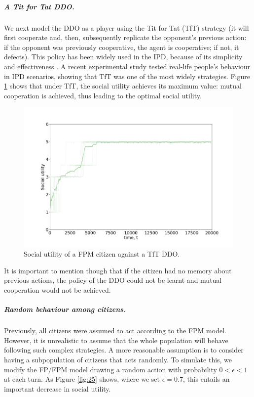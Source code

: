 \subparagraph{A Tit for Tat DDO.}
We next model the DDO as a player using the Tit for Tat (TfT) strategy
(it will first cooperate and, then, subsequently replicate the opponent's previous action: if the opponent was previously cooperative, the agent is cooperative; if not, it defects).
This policy has been widely used in the IPD, because of its simplicity and effectiveness \cite{axelrod84}. A recent experimental study 
\cite{dal2019strategy}
 tested real-life people's behaviour in IPD scenarios,
 showing that TfT was one of the most widely strategies.
 Figure \ref{fig:FPMvsTfT} shows that under TfT, the 
 social utility achieves its maximum value: mutual cooperation is achieved, thus leading to the optimal social utility.

\begin{figure}[h!]
\centering
\includegraphics[width=0.6\linewidth]{img/tft.png}%
\caption{Social utility of a FPM citizen against a TfT DDO.}\label{fig:FPMvsTfT}
\end{figure}

\noindent It is important to mention though that 
if the citizen had no memory about previous actions, the policy of the DDO could not be learnt and mutual cooperation would not be achieved.

\subparagraph{Random behaviour among citizens.}
 Previously,  all citizens were assumed to
 act according to the FPM model.
 However, 
 it is unrealistic to assume
 that the whole population will behave following such complex strategies. A more reasonable
 assumption is to consider having a  subpopulation of citizens that acts randomly. To simulate this, we modify the FP/FPM model drawing a random action with probability $0 < \epsilon < 1$ at each turn. As Figure \ref{fig:25} shows, where we set $\epsilon = 0.7$, this entails an important decrease in social utility. 


